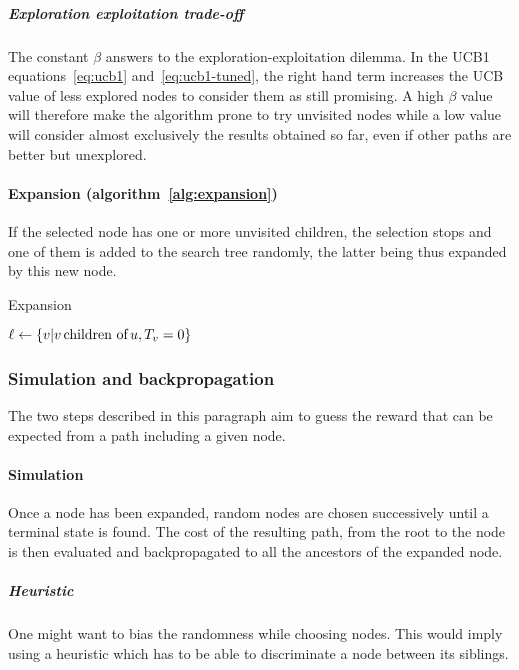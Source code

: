 \documentclass[oneside,twocolumn]{article}
\begin{document}
\subparagraph{Exploration exploitation trade-off} The constant \(\beta\) answers
to the exploration-exploitation dilemma. In the UCB1 equations~\ref{eq:ucb1}
and~\ref{eq:ucb1-tuned},
the right hand term increases the UCB value of less explored nodes to consider them
as still promising. A high \(\beta\) value will therefore make the algorithm
prone to try unvisited nodes while a low value will consider almost exclusively
the results obtained so far, even if other paths are better but unexplored.

\paragraph{Expansion (algorithm~\ref{alg:expansion})}
If the selected node has one or more unvisited children, the selection stops and
one of them is added to the search tree randomly, the latter being thus expanded
by this new node.
\begin{algorithm}
  \caption{Expansion}\label{alg:expansion}
  \begin{algorithmic}
    \State{}$\ell \gets \{ v | v \text{\,children of\,} u, T_v = 0 \}$
    \State{}
    \EndFunction{}
  \end{algorithmic}
\end{algorithm}

\subsubsection{Simulation and backpropagation}
The two steps described in this paragraph aim to guess the reward that can be
expected from a path including a given node.
\paragraph{Simulation}
Once a node has been expanded, random nodes are chosen successively until a
terminal state is found. The cost of the resulting path, from the root to the
node is then evaluated and backpropagated to all the ancestors of the expanded
node.

\subparagraph{Heuristic} One might want to bias the randomness while choosing
nodes. This would imply using a heuristic which has to be able to discriminate
a node between its siblings.
\end{document}
